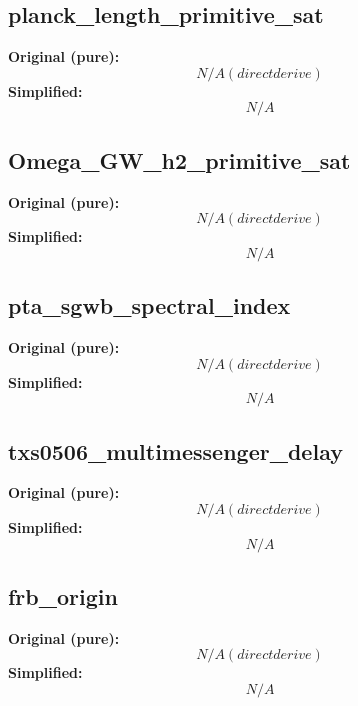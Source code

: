 \subsection{planck_length_primitive_sat}
\textbf{Original (pure):}
\begin{equation}
N/A (direct derive)
\end{equation}
\textbf{Simplified:}
\begin{equation}
N/A
\end{equation}

\subsection{Omega_GW_h2_primitive_sat}
\textbf{Original (pure):}
\begin{equation}
N/A (direct derive)
\end{equation}
\textbf{Simplified:}
\begin{equation}
N/A
\end{equation}

\subsection{pta_sgwb_spectral_index}
\textbf{Original (pure):}
\begin{equation}
N/A (direct derive)
\end{equation}
\textbf{Simplified:}
\begin{equation}
N/A
\end{equation}

\subsection{txs0506_multimessenger_delay}
\textbf{Original (pure):}
\begin{equation}
N/A (direct derive)
\end{equation}
\textbf{Simplified:}
\begin{equation}
N/A
\end{equation}

\subsection{frb_origin}
\textbf{Original (pure):}
\begin{equation}
N/A (direct derive)
\end{equation}
\textbf{Simplified:}
\begin{equation}
N/A
\end{equation}


